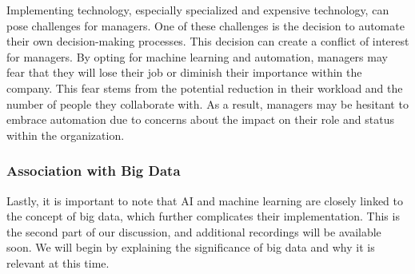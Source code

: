 Implementing technology, especially specialized and expensive
technology, can pose challenges for managers. One of these challenges is
the decision to automate their own decision-making processes. This
decision can create a conflict of interest for managers. By opting for
machine learning and automation, managers may fear that they will lose
their job or diminish their importance within the company. This fear
stems from the potential reduction in their workload and the number of
people they collaborate with. As a result, managers may be hesitant to
embrace automation due to concerns about the impact on their role and
status within the organization.

\subsubsection{Association with Big Data}

Lastly, it is important to note that AI and machine learning are closely
linked to the concept of big data, which further complicates their
implementation. This is the second part of our discussion, and
additional recordings will be available soon. We will begin by
explaining the significance of big data and why it is relevant at this
time.